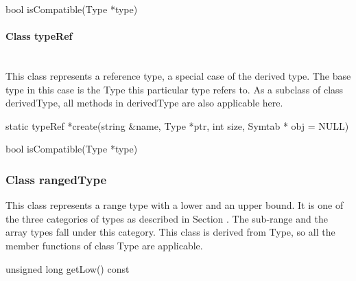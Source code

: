 \begin{apient}
bool isCompatible(Type *type)
\end{apient}

\paragraph{Class typeRef }
\mbox{ }\\

This class represents a reference type, a special case of the derived type. The base type in this case is the Type this particular type refers to. As a subclass of class derivedType, all methods in derivedType are also applicable here. 


\begin{apient}
static typeRef *create(string &name, Type *ptr, int size,
                        Symtab * obj = NULL)
\end{apient}

\begin{apient}
bool isCompatible(Type *type)
\end{apient}

\subsubsection{Class rangedType}
This class represents a range type with a lower and an upper bound. It is one of the three categories of types as described in Section . The sub-range and the array types fall under this category. This class is derived from Type, so all the member functions of class Type are applicable.


\begin{apient}
unsigned long getLow() const
\end{apient}

